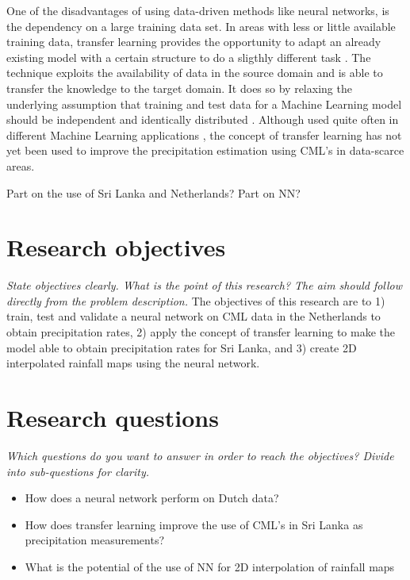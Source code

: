 \documentclass[twocolumn, 10pt, a4paper]{article}
\begin{document}
	One of the disadvantages of using data-driven methods like neural networks, is the dependency on a large training data set. In areas with less or little available training data, transfer learning provides the opportunity to adapt an already existing model with a certain structure to do a sligthly different task \cite{TanYear}. The technique exploits the availability of data in the source domain and is able to transfer the knowledge to the target domain. It does so by relaxing the underlying assumption that training and test data for a Machine Learning model should be independent and identically distributed \cite{Weiss2016}. Although used quite often in different Machine Learning applications \cite{Zhuang2021}, the concept of transfer learning has not yet been used to improve the precipitation estimation using CML's in data-scarce areas. 
	
	Part on the use of Sri Lanka and Netherlands? Part on NN?

	
	\section{Research objectives}
	
	\textit{State objectives clearly. What is the point of this research? The aim should follow directly from the problem description.}
	The objectives of this research are to 1) train, test and validate a neural network on CML data in the Netherlands to obtain precipitation rates, 2) apply the concept of transfer learning to make the model able to obtain precipitation rates for Sri Lanka, and 3) create 2D interpolated rainfall maps using the neural network.
	 
	
	\section{Research questions}
	
	\textit{Which questions do you want to answer in order to reach the objectives? Divide into sub-questions for clarity.}
	\begin{itemize}
		\item How does a neural network perform on Dutch data?
		\item How does transfer learning improve the use of CML's in Sri Lanka as precipitation measurements?
		\item What is the potential of the use of NN for 2D interpolation of rainfall maps
	\end{itemize}
	
\end{document}
